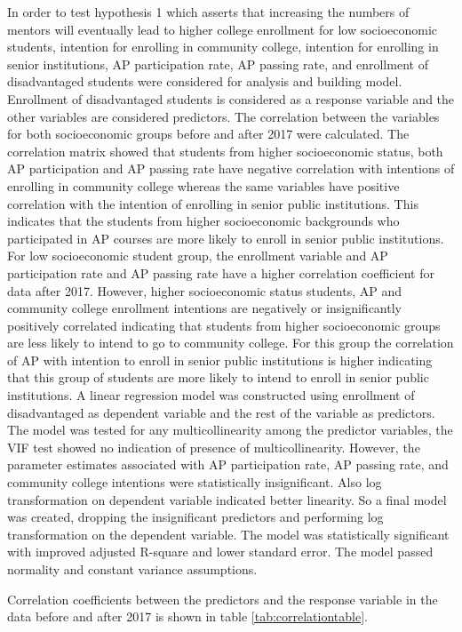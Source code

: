 In order to test hypothesis 1 which asserts that increasing the  numbers of mentors will eventually lead to higher college enrollment for low socioeconomic students, intention for enrolling in community college, intention for enrolling in senior institutions, AP participation rate, AP passing rate, and enrollment of disadvantaged students were considered for analysis and building model. 
Enrollment of disadvantaged students is considered as a response variable and the other variables are considered predictors. 
The correlation between the variables for both socioeconomic groups before and after  2017 were calculated. 
The correlation matrix showed that students from higher socioeconomic status, both AP participation and AP passing rate have negative correlation with intentions of enrolling in community college whereas the same variables 
have positive correlation with the intention of enrolling in senior public institutions. This indicates that the students from higher socioeconomic backgrounds who participated in AP courses are more likely to enroll in senior public institutions. 
For low socioeconomic student group, the enrollment variable and AP participation rate and AP passing rate have a higher correlation coefficient  for data after 2017. 
However, higher socioeconomic status students, AP and community college enrollment intentions are negatively or insignificantly positively correlated indicating that students from higher socioeconomic groups are less likely to intend to go to community college. 
For this group the correlation of AP with intention to enroll in senior public institutions is higher indicating that this group of students are more likely to intend to enroll in senior public institutions. 
A linear regression model was constructed using enrollment of disadvantaged as dependent variable and the rest of the variable as predictors. 
The model was tested for any multicollinearity among the predictor variables, the VIF test showed no indication of presence of multicollinearity. 
However, the parameter estimates associated with AP participation rate, AP passing rate, and community college intentions were statistically insignificant. 
Also log transformation on dependent variable indicated better linearity. 
So a final model was created, dropping the insignificant predictors and performing log transformation on the dependent variable. The model was statistically significant with improved adjusted R-square and lower standard error. 
The model passed normality and constant variance assumptions.

Correlation coefficients between the predictors and the response variable in the data before and after 2017 is shown in table \ref{tab:correlationtable}.

